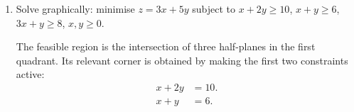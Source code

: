 \begin{enumerate}[label=\thesubsection.\arabic*, ref=\thesubsection.\theenumi]
    Condition on the colour of the reinforced first draw. The initial state is $(R,B)=(3,5)$, so the branch probabilities are $3/8$ and $5/8$. After a red first draw the state is $(5,5)$; after a black first draw it is $(3,7)$. The law of total probability is
    \begin{align*}
        P(E) & =\sum_iP(E\mid S_i)P(S_i).
    \end{align*}
    \hfill\eqref{formula:C12-Q57}

    \par
    For the red branch,
    \begin{align*}
        P(RR\mid R_1) & =\frac5{10}\frac4{9}=\frac29.
    \end{align*}

    For the black branch,
    \begin{align*}
        P(RR\mid B_1) & =\frac3{10}\frac2{9}=\frac1{15}.
    \end{align*}

    Combining the mutually exclusive branches,
    \begin{align*}
        P(RR) & =\frac38\frac29+\frac58\frac1{15}
        =\frac1{12}+\frac1{24}=\frac18.
    \end{align*}

    The state update is applied before the two final draws, preserving the reinforcement dependence.

    The following code verifies the solution.

    \begin{lstlisting}[frame=single, basicstyle=\rmfamily, escapeinside={(*@}{@*)}]
(*@\makebox[\dimexpr\linewidth-2\fboxsep-2\fboxrule\relax][c]{codes/C12/Q57.py}@*)
    \end{lstlisting}


    \par
    \medskip
    \noindent\textbf{Optimization}
    \par
    \smallskip

    \item
    \label{question:C12-Q59}
    \label{question-short:C12-Q59} Solve graphically: minimise $z=3x+5y$ subject to $x+2y\ge10$, $x+y\ge6$, $3x+y\ge8$, $x,y\ge0$.

    \par
    \smallskip
    \solution

    The feasible region is the intersection of three half-planes in the first quadrant. Its relevant corner is obtained by making the first two constraints active:
    \begin{align*}
        x+2y & =10. \\
        x+y  & =6.
    \end{align*}


\end{enumerate}
